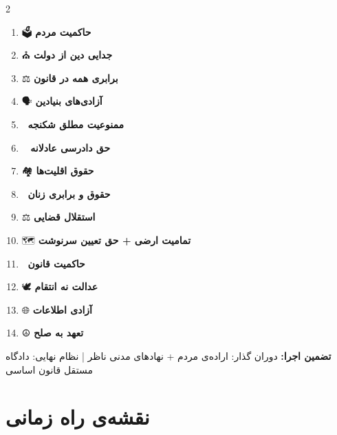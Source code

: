 \documentclass[a4paper,11pt]{article}
\begin{document}
\begin{principlebox}[title={🛡️ ۱۴ اصل غیرقابل‌نقض — خط قرمز مطلق}]
\begin{multicols}{2}
\begin{enumerate}[label=\textcolor{mahestan-blue}{\bfseries\arabic*.}, itemsep=2pt, font=\small]
    \item 🗳️ \textbf{حاکمیت مردم}
    \item ⛪ \textbf{جدایی دین از دولت}
    \item ⚖️ \textbf{برابری همه در قانون}
    \item 🗣️ \textbf{آزادی‌های بنیادین}
    \item 🚫 \textbf{ممنوعیت مطلق شکنجه}
    \item 👨‍⚖️ \textbf{حق دادرسی عادلانه}
    \item 🏘️ \textbf{حقوق اقلیت‌ها}
    \item 👩 \textbf{حقوق و برابری زنان}
    \item ⚖️ \textbf{استقلال قضایی}
    \item 🗺️ \textbf{تمامیت ارضی + حق تعیین سرنوشت}
    \item 📜 \textbf{حاکمیت قانون}
    \item 🕊️ \textbf{عدالت نه انتقام}
    \item 🌐 \textbf{آزادی اطلاعات}
    \item ☮️ \textbf{تعهد به صلح}
\end{enumerate}
\end{multicols}
\vspace{0.2cm}
{\footnotesize\textcolor{text-medium}{%
\textbf{تضمین اجرا:}
دوران گذار: اراده‌ی مردم + نهادهای مدنی ناظر
\quad|\quad
نظام نهایی: دادگاه مستقل قانون اساسی}}
\end{principlebox}

\section{نقشه‌ی راه زمانی}
\end{document}
